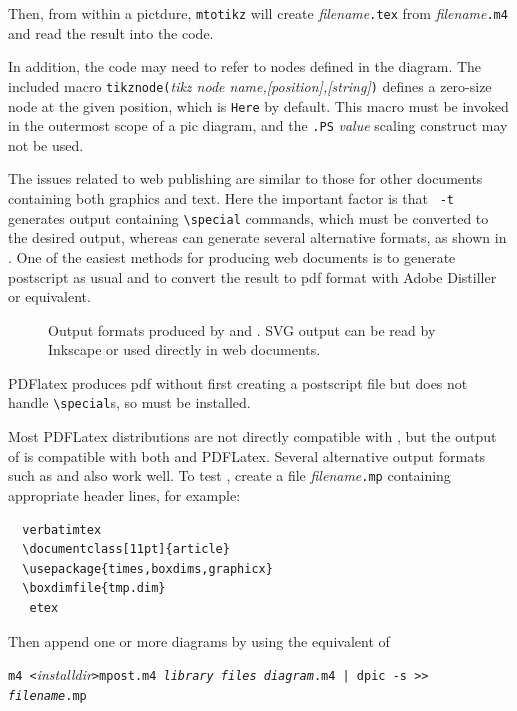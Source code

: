 Then, from within a \Tikz pictdure, 
{\tt \bsl{}mtotikz\rbr}
will create {\sl filename}{\tt .tex} from {\sl filename}{\tt .m4}
and read the result into the \Tikz code.

In addition, the \Tikz code may need to refer to nodes defined in
the \pic diagram.
The included \Mfour macro
{\tt tikznode(}{\sl tikz node name,[position],[string]}{\tt)}
defines a zero-size \Tikz node at the given \pic position, which is
{\tt Here} by default.
This macro must be
invoked in the outermost scope of a pic diagram, and the
{\tt .PS} {\sl value} scaling construct may not be used. 


The issues related to web publishing are similar to those for other
documents containing both graphics and text.
Here the important factor is that \gpic\ {\tt -t} generates output
containing \tpic \verb|\special| commands, which must be converted
to the desired output, whereas \dpic can generate several alternative
formats, as shown in .
One of the easiest methods
for producing web documents is to generate postscript as usual and to
convert the result to pdf format with Adobe Distiller or equivalent.
\begin{figure}[H]
   
   \caption{Output formats produced by  and \dpic.
      SVG output can be read by Inkscape or used directly in web documents.}
   \label{Workflow}
   \end{figure}

PDFlatex produces pdf without first creating a postscript file
but does not handle \tpic \verb|\special|s, so \dpic must be
installed.

Most PDFLatex distributions are not directly compatible with \PSTricks, but
the \TPGF output of \dpic is compatible with both \latex and PDFLatex.
Several alternative \dpic output formats such as
\mfpic and \MetaPost also work well.
To test \MetaPost, create a file {\sl filename}{\tt .mp}
containing appropriate header lines, for example:
\begin{verbatim}
  verbatimtex
  \documentclass[11pt]{article}
  \usepackage{times,boxdims,graphicx}
  \boxdimfile{tmp.dim}
   etex
\end{verbatim}
Then append one or more diagrams by using the equivalent of

{\tt m4 <}{\sl installdir}{\tt >mpost.m4 {\sl library files}
  {\sl diagram}.m4 | dpic -s >> {\sl filename}.mp}

